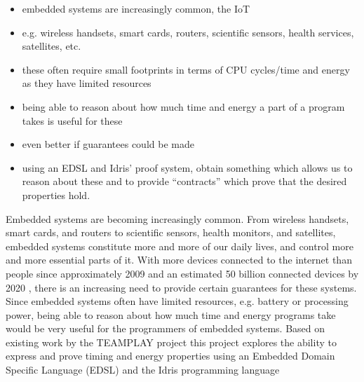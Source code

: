 \begin{itemize}
	\item embedded systems are increasingly common, the IoT
	\item e.g. wireless handsets, smart cards, routers, scientific sensors,
		  health services, satellites, etc.
	\item these often require small footprints in terms of CPU cycles/time and
		  energy as they have limited resources
	\item being able to reason about how much time and energy a part of a
		  program takes is useful for these
	\item even better if guarantees could be made
	\item using an EDSL and Idris' proof system, obtain something which allows
		  us to reason about these and to provide ``contracts'' which prove that
		  the desired properties hold.
\end{itemize}

Embedded systems are becoming increasingly common. From wireless handsets, smart cards, and routers to scientific sensors, health monitors, and satellites, embedded systems constitute more and more of our daily lives, and control more and more essential parts of it. With more devices connected to the internet than people since approximately 2009 and an estimated 50 billion connected devices by 2020 \cite{cisco-whitepaper}, there is an increasing need to provide certain guarantees for these systems. Since embedded systems often have limited resources, e.g. battery or processing power, being able to reason about how much time and energy programs take would be very useful for the programmers of embedded systems. Based on existing work by the TEAMPLAY project \cite{teamplay:d1.1} this project explores the ability to express and prove timing and energy properties using an Embedded Domain Specific Language (EDSL) and the Idris programming language \cite{brady_2013}